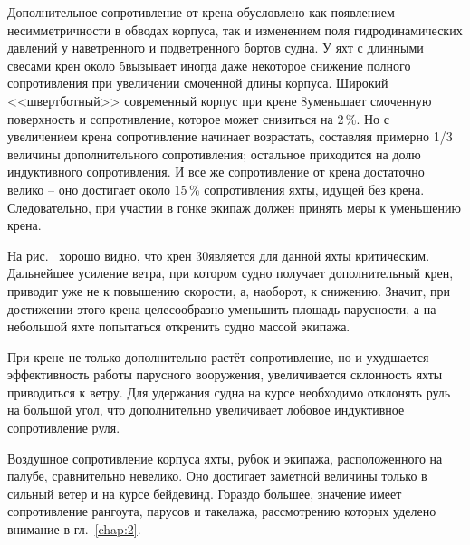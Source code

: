 Дополнительное сопротивление от крена обусловлено как появлением
несимметричности в обводах корпуса, так и изменением поля
гидродинамических давлений у наветренного и подветренного бортов
судна. У яхт с длинными свесами крен около 5\gr вызывает иногда даже
некоторое снижение полного сопротивления при увеличении смоченной
длины корпуса. Широкий <<швертботный>> современный корпус при крене
8\gr уменьшает смоченную поверхность и сопротивление, которое
может снизиться на 2\,\%. Но с увеличением крена сопротивление
начинает возрастать, составляя примерно 1/3 величины дополнительного
сопротивления; остальное приходится на долю индуктивного
сопротивления. И все же сопротивление от крена достаточно велико \---
оно достигает около 15\,\% сопротивления яхты, идущей без
крена. Следовательно, при участии в гонке экипаж должен принять меры к
уменьшению крена.

На рис.~ хорошо видно, что крен 30\gr является для данной яхты
критическим. Дальнейшее усиление ветра, при котором судно получает
дополнительный крен, приводит уже не к повышению скорости, а,
наоборот, к снижению. Значит, при достижении этого крена целесообразно
уменьшить площадь парусности, а на небольшой яхте попытаться откренить
судно массой экипажа.

При крене не только дополнительно растёт сопротивление, но и
ухудшается эффективность работы парусного вооружения, увеличивается
склонность яхты приводиться к ветру. Для удержания судна на курсе
необходимо отклонять руль на большой угол, что дополнительно
увеличивает лобовое индуктивное сопротивление руля.

Воздушное сопротивление корпуса яхты, рубок и экипажа, расположенного
на палубе, сравнительно невелико. Оно достигает заметной величины
только в сильный ветер и на курсе бейдевинд. Гораздо большее, значение
имеет сопротивление рангоута, парусов и такелажа, рассмотрению которых
уделено внимание в гл.~\ref{chap:2}.


